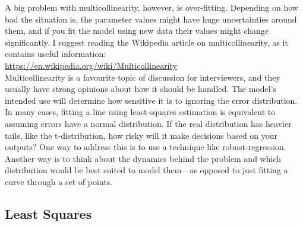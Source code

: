 \documentclass{article}
\theoremstyle{definition}
\begin{document}
\begin{enumerate}
    A big problem with multicollinearity, however, is over-fitting.
    Depending on how bad the situation is, the parameter values might have huge uncertainties around them, and if you fit the model using new data their values might change significantly.
    I suggest reading the Wikipedia article on multicollinearity, as it contains useful information: \\
    \url{https://en.wikipedia.org/wiki/Multicollinearity} \\
    Multicollinearity is a favourite topic of discussion for interviewers, and they usually have strong opinions about how it should be handled.
    The model's intended use will determine how sensitive it is to ignoring the error distribution.
    In many cases, fitting a line using least-squares estimation is equivalent to assuming errors have a normal distribution.
    If the real distribution has heavier tails, like the t-distribution, how risky will it make decisions based on your outputs?
    One way to address this is to use a technique like robust-regression.
    Another way is to think about the dynamics behind the problem and which distribution would be best suited to model them---as opposed to just fitting a curve through a set of points.
  \end{enumerate}

  \subsection{Least Squares}
\end{document}
